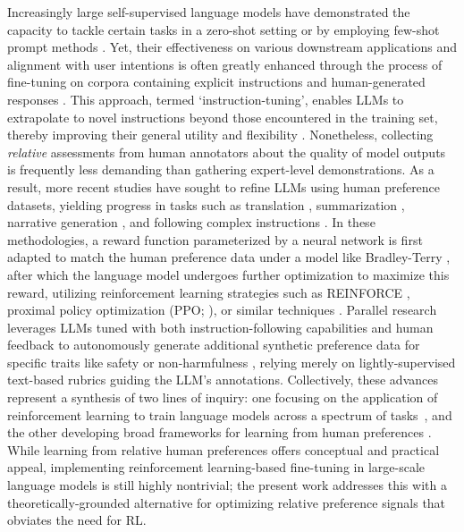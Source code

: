 Increasingly large self-supervised language models have demonstrated the capacity to tackle certain tasks in a zero-shot setting \citep{radford2019language} or by employing few-shot prompt methods \citep{gpt3,megatron,chowdhery2022palm}. Yet, their effectiveness on various downstream applications and alignment with user intentions is often greatly enhanced through the process of fine-tuning on corpora containing explicit instructions and human-generated responses \citep{mishra-etal-2022-cross,sanh2022multitask,chung2022scaling,thoppilan2022lamda}. This approach, termed `instruction-tuning', enables LLMs to extrapolate to novel instructions beyond those encountered in the training set, thereby improving their general utility and flexibility \citep{chung2022scaling}. Nonetheless, collecting \textit{relative} assessments from human annotators about the quality of model outputs is frequently less demanding than gathering expert-level demonstrations. As a result, more recent studies have sought to refine LLMs using human preference datasets, yielding progress in tasks such as translation \citep{kreutzer-etal-2018-reliability}, summarization \citep{stiennon2022learning,ziegler2020finetuning}, narrative generation \citep{ziegler2020finetuning}, and following complex instructions \citep{ouyang2022training,ramamurthy2023is}. In these methodologies, a reward function parameterized by a neural network is first adapted to match the human preference data under a model like Bradley-Terry \citep{bradley1952rankanalysis}, after which the language model undergoes further optimization to maximize this reward, utilizing reinforcement learning strategies such as REINFORCE \citep{williams1992reinforce}, proximal policy optimization (PPO; \cite{schulman2017proximal}), or similar techniques \citep{ramamurthy2023is}. Parallel research leverages LLMs tuned with both instruction-following capabilities and human feedback to autonomously generate additional synthetic preference data for specific traits like safety or non-harmfulness \citep{bai2022constitutional}, relying merely on lightly-supervised text-based rubrics guiding the LLM's annotations. Collectively, these advances represent a synthesis of two lines of inquiry: one focusing on the application of reinforcement learning to train language models across a spectrum of tasks~\citep{Ranzato2015SequenceLT,paulus2018a,wu2018learning}, and the other developing broad frameworks for learning from human preferences \citep{christiano2017deep,kupcsik2018learning}. While learning from relative human preferences offers conceptual and practical appeal, implementing reinforcement learning-based fine-tuning in large-scale language models is still highly nontrivial; the present work addresses this with a theoretically-grounded alternative for optimizing relative preference signals that obviates the need for RL.

